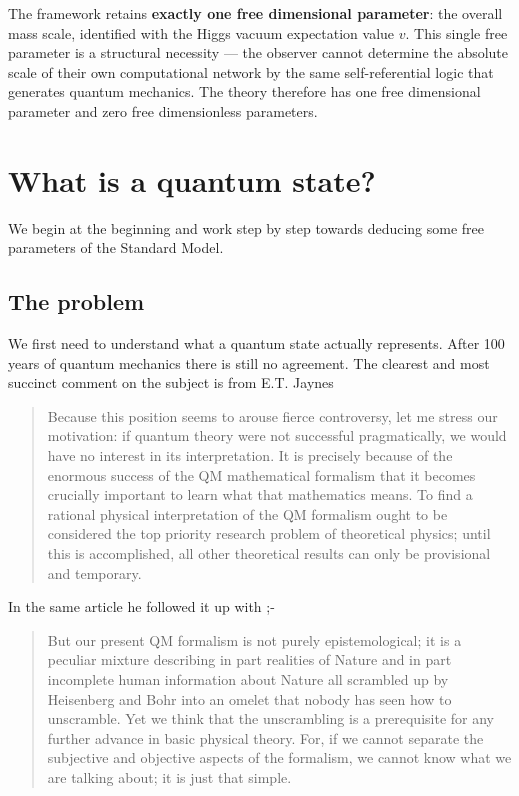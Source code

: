 \documentclass{article}
\begin{document}
The framework retains \textbf{exactly one free dimensional parameter}: the overall mass scale, identified with the Higgs vacuum expectation value $v$. This single free parameter is a structural necessity --- the observer cannot determine the absolute scale of their own computational network by the same self-referential logic that generates quantum mechanics. The theory therefore has one free dimensional parameter and zero free dimensionless parameters.

\section{What is a quantum state?}
We begin at the beginning and work step by step towards deducing some free parameters of the Standard Model.
\subsection{The problem}
  We first need to understand what a quantum state actually represents. After 100 years of quantum mechanics there is still no agreement. The clearest and most succinct comment on the subject is from E.T. Jaynes \autocite{Jaynes_89_a}
\begin{quotation}
  Because this position seems to arouse fierce controversy, let me stress our motivation: if quantum theory were not successful pragmatically, we would have no interest in its interpretation. It is precisely because of the enormous success of the QM mathematical formalism that it becomes crucially important to learn what that mathematics means. To find a rational physical interpretation of the QM formalism ought to be considered the top priority research problem of theoretical physics; until this is accomplished, all other theoretical results can only be provisional and temporary.
\end{quotation}
In the same article he followed it up with ;-
\begin{quotation}
  But our present QM formalism is not purely epistemological; it is a peculiar mixture describing in part realities of Nature and in part incomplete human information about Nature all scrambled up by Heisenberg and Bohr into an omelet that nobody has seen how to unscramble. Yet we think that the unscrambling is a prerequisite for any further advance in basic physical theory. For, if we cannot separate the subjective and objective aspects of the formalism, we cannot know what we are talking about; it is just that simple.
\end{quotation}
\end{document}
